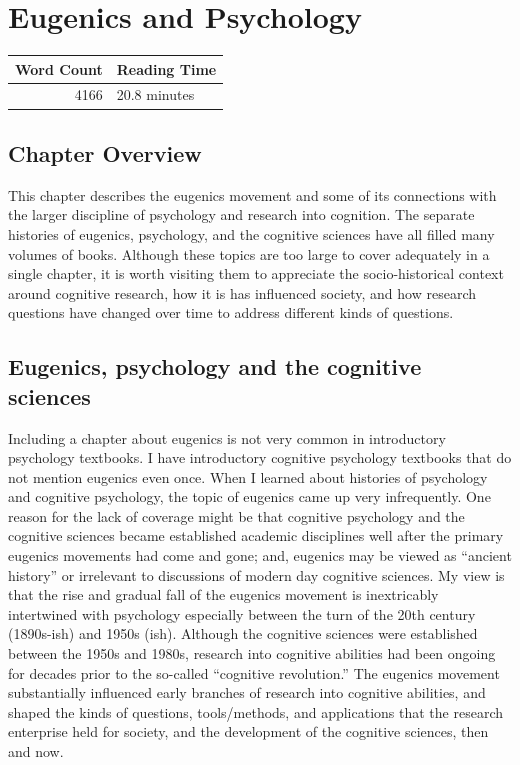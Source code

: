 \documentclass[
  oneside,
  12pt]{crumpbook}
\begin{document}
\hypertarget{eugenics-and-psychology}{%
\chapter{Eugenics and Psychology}\label{eugenics-and-psychology}}

\begin{tabular}{r|l}
\hline
Word Count & Reading Time\\
\hline
4166 & 20.8 minutes\\
\hline
\end{tabular}

\hypertarget{chapter-overview-2}{%
\section{Chapter Overview}\label{chapter-overview-2}}

This chapter describes the eugenics movement and some of its connections with the larger discipline of psychology and research into cognition. The separate histories of eugenics, psychology, and the cognitive sciences have all filled many volumes of books. Although these topics are too large to cover adequately in a single chapter, it is worth visiting them to appreciate the socio-historical context around cognitive research, how it is has influenced society, and how research questions have changed over time to address different kinds of questions.

\hypertarget{eugenics-psychology-and-the-cognitive-sciences}{%
\section{Eugenics, psychology and the cognitive sciences}\label{eugenics-psychology-and-the-cognitive-sciences}}

Including a chapter about eugenics is not very common in introductory psychology textbooks. I have introductory cognitive psychology textbooks that do not mention eugenics even once. When I learned about histories of psychology and cognitive psychology, the topic of eugenics came up very infrequently. One reason for the lack of coverage might be that cognitive psychology and the cognitive sciences became established academic disciplines well after the primary eugenics movements had come and gone; and, eugenics may be viewed as ``ancient history'' or irrelevant to discussions of modern day cognitive sciences. My view is that the rise and gradual fall of the eugenics movement is inextricably intertwined with psychology especially between the turn of the 20th century (1890s-ish) and 1950s (ish). Although the cognitive sciences were established between the 1950s and 1980s, research into cognitive abilities had been ongoing for decades prior to the so-called ``cognitive revolution.'' The eugenics movement substantially influenced early branches of research into cognitive abilities, and shaped the kinds of questions, tools/methods, and applications that the research enterprise held for society, and the development of the cognitive sciences, then and now.
\end{document}
